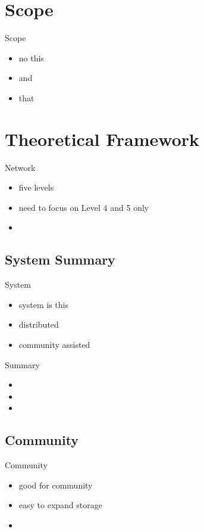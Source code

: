 \documentclass{beamer}
\begin{document}
\section{Scope}
\begin{frame}{Scope}
  \begin{itemize}   
    \item no this
    \item and
    \item that
  \end{itemize}
\end{frame}


\section{Theoretical Framework}
\begin{frame}{Network}
  \begin{itemize}   
    \item five levels
    \item need to focus on Level 4 and 5 only
    \item 
  \end{itemize}
\end{frame}

\subsection{System Summary}
\begin{frame}{System}
  \begin{itemize}   
    \item system is this
    \item distributed
    \item community assisted
  \end{itemize}
\end{frame}

\begin{frame}{Summary}
  \begin{itemize}   
    \item 
    \item 
    \item 
  \end{itemize}
\end{frame}

\subsection{Community}
\begin{frame}{Community}
  \begin{itemize}   
    \item good for community
    \item easy to expand storage
    \item 
  \end{itemize}
\end{frame}
\end{document}
